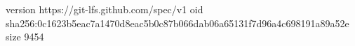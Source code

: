 version https://git-lfs.github.com/spec/v1
oid sha256:0c1623b5eac7a1470d8eac5b0c87b066dab06a65131f7d96a4c698191a89a52e
size 9454
